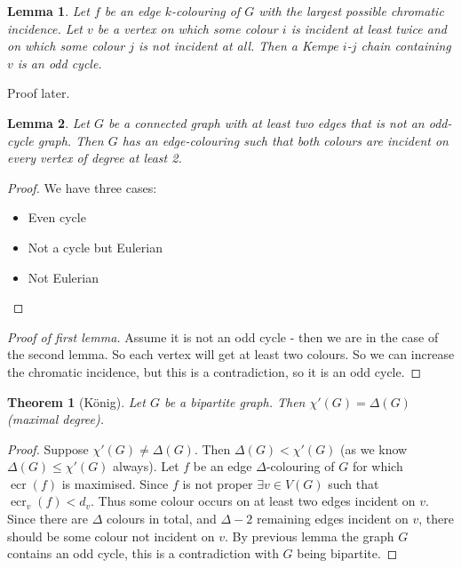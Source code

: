 \documentclass{article}
\newtheorem*{thm}{Theorem}
\newtheorem*{lem}{Lemma}
\theoremstyle{definition}
\DeclareMathOperator{\ecr}{ecr}
\begin{document}
\begin{lem}
Let $f$ be an edge $k$-colouring of $G$ with the largest possible chromatic incidence.
Let $v$ be a vertex on which some colour $i$ is incident at least twice and on which some colour $j$ is not incident at all.
Then a Kempe $i$-$j$ chain containing $v$ is an odd cycle.
\end{lem}

Proof later.

\begin{lem}
Let $G$ be a connected graph with at least two edges that is not an odd-cycle graph.
Then $G$ has an edge-colouring such that both colours are incident on every vertex of degree at least 2.
\end{lem}

\begin{proof}
We have three cases: \\
\begin{itemize}
\item Even cycle
\item Not a cycle but Eulerian
\item Not Eulerian
\end{itemize}
\end{proof}

\begin{proof}[Proof of first lemma]
Assume it is not an odd cycle - then we are in the case of the second lemma.
So each vertex will get at least two colours.
So we can increase the chromatic incidence, but this is a contradiction, so it is an odd cycle.
\end{proof}

\begin{thm}[K\"onig]
Let $G$ be a bipartite graph.
Then $\chi'(G) = \Delta(G)$ (maximal degree).
\end{thm}

\begin{proof}
Suppose $\chi'(G) \ne \Delta(G)$.
Then $\Delta(G) < \chi'(G)$ (as we know $\Delta(G) \le \chi'(G)$ always).
Let $f$ be an edge $\Delta$-colouring of $G$ for which $\ecr(f)$ is maximised.
Since $f$ is not proper $\exists v\in V(G)$ such that $\ecr_v(f) < d_v$.
Thus some colour occurs on at least two edges incident on $v$.
Since there are $\Delta$ colours in total, and $\Delta-2$ remaining edges incident on $v$, there should be some colour not incident on $v$.
By previous lemma the graph $G$ contains an odd cycle, this is a contradiction with $G$ being bipartite.
\end{proof}
\end{document}
